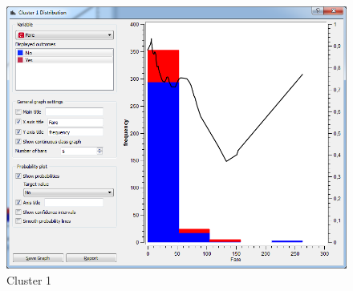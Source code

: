 \documentclass[a4paper,11pt]{article}
\begin{document}
\begin{figure}[h]
\begin{center}
		\includegraphics[scale=0.30]{ClusterDistribution/Cluster1/Fare}
	\end{center}
	\caption{Cluster 1}
	\label{ClusterOne}
\end{figure}
\end{document}
